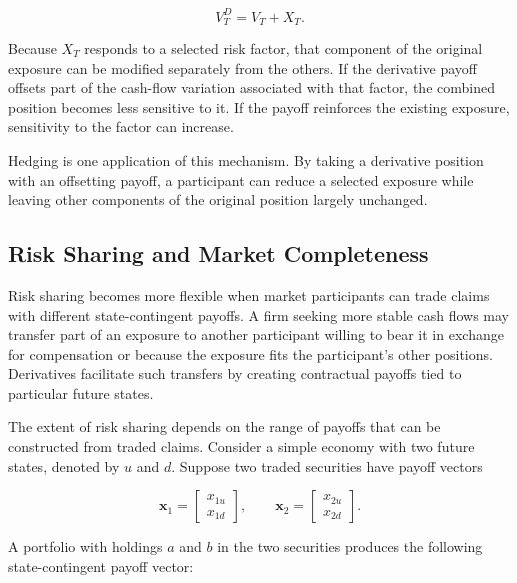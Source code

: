\begin{equation}
V_T^{D}=V_T+X_T.
\label{eq:ch11-combined-derivative-position}
\end{equation}

Because $X_T$ responds to a selected risk factor, that component of the original exposure can be modified separately from the others. If the derivative payoff offsets part of the cash-flow variation associated with that factor, the combined position becomes less sensitive to it. If the payoff reinforces the existing exposure, sensitivity to the factor can increase.

Hedging is one application of this mechanism. By taking a derivative position with an offsetting payoff, a participant can reduce a selected exposure while leaving other components of the original position largely unchanged.

\subsection{Risk Sharing and Market Completeness}

Risk sharing becomes more flexible when market participants can trade claims with different state-contingent payoffs. A firm seeking more stable cash flows may transfer part of an exposure to another participant willing to bear it in exchange for compensation or because the exposure fits the participant's other positions. Derivatives facilitate such transfers by creating contractual payoffs tied to particular future states.

The extent of risk sharing depends on the range of payoffs that can be constructed from traded claims. Consider a simple economy with two future states, denoted by $u$ and $d$. Suppose two traded securities have payoff vectors

\begin{equation}
\mathbf{x}_1=
\begin{bmatrix}
x_{1u}\\
x_{1d}                                                      
\end{bmatrix},
\qquad
\mathbf{x}_2=
\begin{bmatrix}
x_{2u}\\
x_{2d}
\end{bmatrix}.
\label{eq:ch11-two-security-payoffs}
\end{equation}

A portfolio with holdings $a$ and $b$ in the two
securities produces the following state-contingent
payoff vector:

